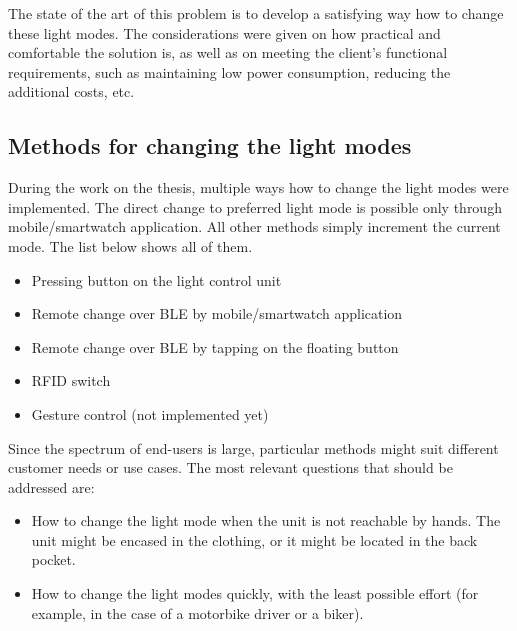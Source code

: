         The state of the art of this problem is to develop a satisfying way how to change these light modes. The considerations were given on how practical and comfortable the solution is, as well as on meeting the client's functional requirements, such as maintaining low power consumption, reducing the additional costs, etc. 
       
       \subsection{Methods for changing the light modes}
        \label{sec:light_modes_methods}
        
        During the work on the thesis, multiple ways how to change the light modes were implemented. The direct change to preferred light mode is possible only through mobile/smartwatch application. All other methods simply increment the current mode.
        The list below shows all of them.
        
        \begin{itemize}
            \item Pressing button on the light control unit
            \item Remote change over BLE by mobile/smartwatch application
            \item Remote change over BLE by tapping on the floating button
            \item RFID switch
            \item Gesture control (not implemented yet) 
        \end{itemize}
        

        Since the spectrum of end-users is large, particular methods might suit different customer needs or use cases. The most relevant questions that should be addressed are: \\
        
        \begin{itemize}
        \setlength\itemsep{0em}
            \item  How to change the light mode when the unit is not reachable by hands. The unit might be encased in the clothing, or it might be located in the back pocket. \\
            \item How to change the light modes quickly, with the least possible effort (for example, in the case of a motorbike driver or a biker). 
        \end{itemize}
        
